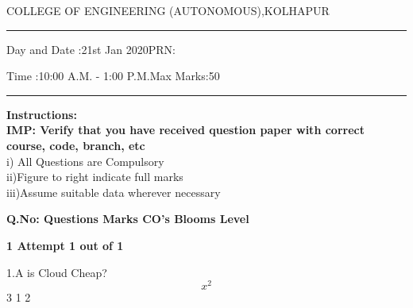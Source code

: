 \documentclass[12pt]{article}
\begin{document}
	
\par
COLLEGE OF ENGINEERING (AUTONOMOUS),KOLHAPUR
\par\noindent\rule{\textwidth}{0.4pt}
\par
{}\par
{}\par
\begin{flushleft}
Day and Date :{21st Jan 2020}\hspace{3.5cm}PRN:
\end{flushleft}

\begin{flushleft}
Time :{10:00 A.M. - 1:00 P.M.}\hspace{3cm}Max Marks:{50}\\
\end{flushleft}
\noindent\rule{\textwidth}{0.1pt}
\begin{flushleft}
{\bf Instructions:}\\
{\hspace{0.5cm} \bf IMP: Verify that you have received question paper with correct course, code, branch, etc}\\
\hspace{1cm}i) All Questions are Compulsory\\
\hspace{1cm}ii)Figure to right indicate full marks\\
\hspace{1cm}iii)Assume suitable data wherever necessary\\
\end{flushleft} 

\begin{flushleft}
{\bf Q.No: \hspace{2.5cm} \bf Questions \hspace{0.25cm} \bf Marks \hspace{0.25cm} \bf CO's\hspace{0.25cm} \bf Blooms Level}	
\end{flushleft}

\begin{flushleft}
\bf 1 \hspace{2cm} Attempt 1 out of 1\\  
\end{flushleft}	
\begin{flushleft}
 {1.A}\hspace{2cm}
is Cloud Cheap? \[x^{2}\] \hspace{1cm}  3 \hspace{1cm} 1 \hspace{1cm} 2\par
\end{flushleft}	



	
	
	
\end{document}
